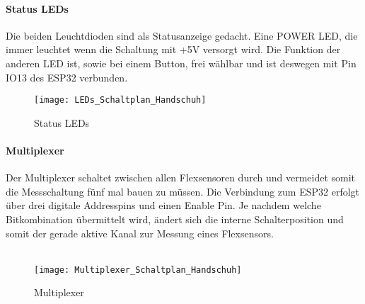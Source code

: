 \documentclass[titlepage,12pt,twoside]{article}
\begin{document}
\paragraph{Status LEDs}
\hfill \break
\hfill \break
Die beiden Leuchtdioden sind als Statusanzeige gedacht. Eine POWER LED, die immer leuchtet wenn die Schaltung mit +5V
versorgt wird. Die Funktion der anderen LED ist, sowie bei einem Button, frei wählbar und ist deswegen mit Pin IO13 des ESP32
verbunden. \\
\begin{figure}[H]
	\begin{center}
		\scalebox{0.5}
		{\texttt{[image: LEDs\_Schaltplan\_Handschuh]}}
		\caption{Status LEDs}
		\label{fig:LEDs_Schaltplan_Handschuh}		
	\end{center}
\end{figure}

\paragraph{Multiplexer}
\hfill \break
\hfill \break
Der Multiplexer schaltet zwischen allen Flexsensoren durch und vermeidet somit die Messschaltung fünf mal bauen zu müssen. 
Die Verbindung zum ESP32 erfolgt über drei digitale Addresspins und einen Enable Pin. Je nachdem welche Bitkombination übermittelt
wird, ändert sich die interne Schalterposition und somit der gerade aktive Kanal zur Messung eines Flexsensors. \\
\\
\begin{figure}[H]
	\begin{center}
		\scalebox{0.5}
		{\texttt{[image: Multiplexer\_Schaltplan\_Handschuh]}}
		\caption{Multiplexer}
		\label{fig:Multiplexer_Schaltplan_Handschuh}		
	\end{center}
\end{figure}
\end{document}
